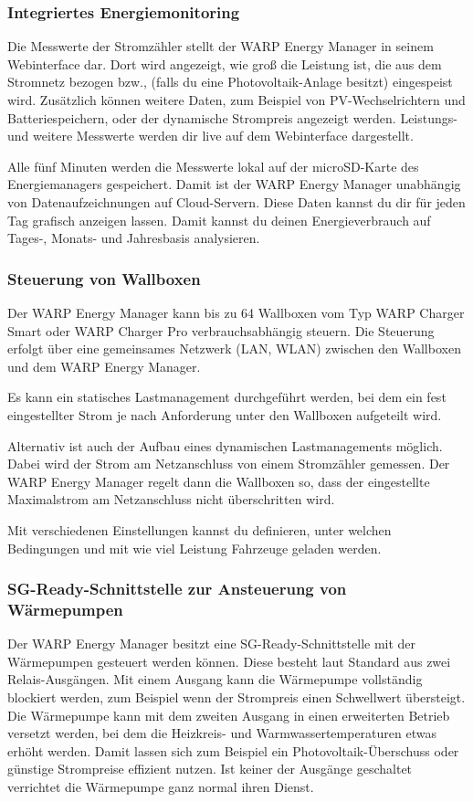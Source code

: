 \documentclass[a4paper,10pt]{article}
\begin{document}
\begin{multicols*}{2}
	\subsubsection{Integriertes Energiemonitoring}
	Die Messwerte der Stromzähler stellt der WARP Energy Manager in seinem
	Webinterface dar. Dort wird angezeigt, wie groß die Leistung ist, die aus dem Stromnetz
	bezogen bzw., (falls du eine Photovoltaik-Anlage besitzt) eingespeist wird. Zusätzlich können
    weitere Daten, zum Beispiel von PV-Wechselrichtern und Batteriespeichern, oder der dynamische Strompreis
    angezeigt werden. Leistungs- und weitere Messwerte werden dir live auf dem Webinterface dargestellt.

	Alle fünf Minuten werden die Messwerte lokal auf der microSD-Karte des
	Energiemanagers gespeichert. Damit ist der WARP Energy Manager unabhängig
	von Datenaufzeichnungen auf Cloud-Servern. Diese Daten kannst du dir für jeden Tag
	grafisch anzeigen lassen. Damit kannst du deinen Energieverbrauch auf Tages-, Monats- und
	Jahresbasis analysieren.

	\subsubsection{Steuerung von Wallboxen}
	Der WARP Energy Manager kann bis zu 64 Wallboxen vom Typ WARP Charger Smart oder WARP Charger Pro verbrauchsabhängig steuern.
	Die Steuerung erfolgt über eine gemeinsames Netzwerk (LAN, WLAN) zwischen den Wallboxen und dem WARP Energy Manager.

    Es kann ein statisches Lastmanagement durchgeführt werden, bei dem ein fest eingestellter Strom je nach Anforderung
    unter den Wallboxen aufgeteilt wird.

    Alternativ ist auch der Aufbau eines dynamischen Lastmanagements möglich. Dabei wird der Strom am Netzanschluss
    von einem Stromzähler gemessen. Der WARP Energy Manager regelt dann die Wallboxen so, dass der eingestellte Maximalstrom
    am Netzanschluss nicht überschritten wird.

	Mit verschiedenen Einstellungen kannst du definieren,
	unter welchen Bedingungen und mit wie viel Leistung Fahrzeuge geladen werden.

	\subsubsection{SG-Ready-Schnittstelle zur Ansteuerung von Wärmepumpen}
    Der WARP Energy Manager besitzt eine SG-Ready-Schnittstelle mit der Wärmepumpen gesteuert werden können.
    Diese besteht laut Standard aus zwei Relais-Ausgängen. Mit einem Ausgang kann die Wärmepumpe vollständig blockiert werden,
    zum Beispiel wenn der Strompreis einen Schwellwert übersteigt. Die Wärmepumpe kann mit dem zweiten
    Ausgang in einen erweiterten Betrieb versetzt werden, bei dem die Heizkreis- und Warmwassertemperaturen etwas erhöht werden.
    Damit lassen sich zum Beispiel ein Photovoltaik-Überschuss oder günstige Strompreise effizient nutzen. Ist keiner
    der Ausgänge geschaltet verrichtet die Wärmepumpe ganz normal ihren Dienst.


\end{multicols*}
\end{document}
